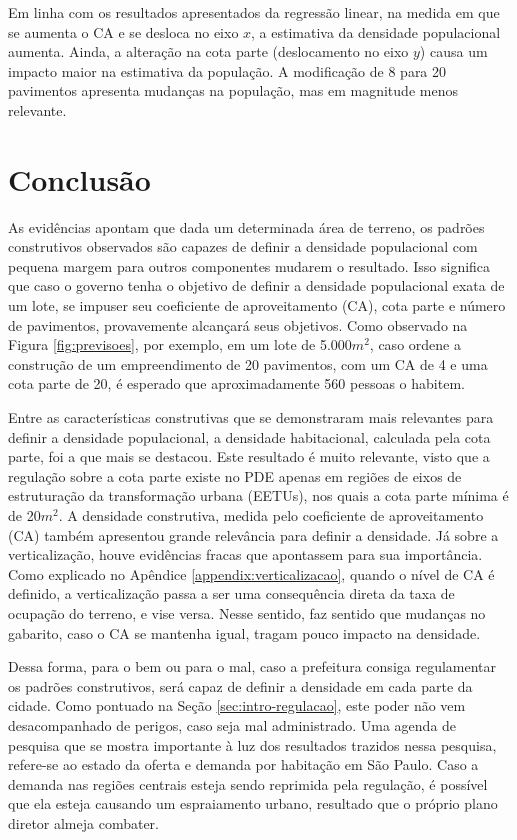 Em linha com os resultados apresentados da regressão linear, na medida em que se aumenta o CA e se desloca no eixo $x$, a estimativa da densidade populacional aumenta. Ainda, a alteração na cota parte (deslocamento no eixo $y$) causa um impacto maior na estimativa da população. A modificação de 8 para 20 pavimentos apresenta mudanças na população, mas em magnitude menos relevante.


\chapter{Conclusão}
\label{sec:conclusao}

As evidências apontam que dada um determinada área de terreno, os padrões construtivos observados são capazes de definir a densidade populacional com pequena margem para outros componentes mudarem o resultado. Isso significa que caso o governo tenha o objetivo de definir a densidade populacional exata de um lote, se impuser seu coeficiente de aproveitamento (CA), cota parte e número de pavimentos, provavemente alcançará seus objetivos. Como observado na Figura \ref{fig:previsoes}, por exemplo, em um lote de 5.000$m^2$, caso ordene a construção de um empreendimento de 20 pavimentos, com um CA de 4 e uma cota parte de 20, é esperado que aproximadamente 560 pessoas o habitem. 

Entre as características construtivas que se demonstraram mais relevantes para definir a densidade populacional, a densidade habitacional, calculada pela cota parte, foi a que mais se destacou. Este resultado é muito relevante, visto que a regulação sobre a cota parte existe no PDE apenas em regiões de eixos de estruturação da transformação urbana (EETUs), nos quais a cota parte mínima é de 20$m^2$. A densidade construtiva, medida pelo coeficiente de aproveitamento (CA) também apresentou grande relevância para definir a densidade. Já sobre a verticalização, houve evidências fracas que apontassem para sua importância. Como explicado no Apêndice \ref{appendix:verticalizacao}, quando o nível de CA é definido, a verticalização passa a ser uma consequência direta da taxa de ocupação do terreno, e vise versa. Nesse sentido, faz sentido que mudanças no gabarito, caso o CA se mantenha igual, tragam pouco impacto na densidade.

Dessa forma, para o bem ou para o mal, caso a prefeitura consiga regulamentar os padrões construtivos, será capaz de definir a densidade em cada parte da cidade. Como pontuado na Seção \ref{sec:intro-regulacao}, este poder não vem desacompanhado de perigos, caso seja mal administrado. Uma agenda de pesquisa que se mostra importante à luz dos resultados trazidos nessa pesquisa, refere-se ao estado da oferta e demanda por habitação em São Paulo. Caso a demanda nas regiões centrais esteja sendo reprimida pela regulação, é possível que ela esteja causando um espraiamento urbano, resultado que o próprio plano diretor almeja combater.

